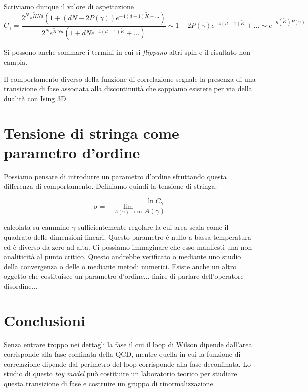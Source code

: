 \documentclass[12pt,a4paper]{article}
\begin{document}
Scriviamo dunque il valore di aspettazione
\begin{equation}
C_{\gamma} = \frac{2^{N} e^{\tilde{K} N d} \left( 1 + \left( dN - 2P(\gamma) \right) e^{-4 (d-1) \tilde{K} + ...} \right) }{2^{N} e^{\tilde{K} N d} \left( 1 + dN e^{-4 (d-1) \tilde{K}} + ... \right)} \sim 1 - 2P(\gamma) e^{-4 (d-1) \tilde{K}} + ... \sim e^{-g(\tilde{K}) P(\gamma)}
\end{equation}

Si possono anche sommare i termini in cui si \emph{flippano} altri spin e il risultato non cambia. 


Il comportamento diverso della funzione di correlazione segnale la presenza di una transizione di fase associata alla discontinuità che sappiamo esistere per via della dualità con Ising 3D

\section{Tensione di stringa come parametro d'ordine}

Possiamo pensare di introdurre un parametro d'ordine sfruttando questa differenza di comportamento. Definiamo quindi la tensione di stringa:

\begin{equation}
\sigma = - \lim_{A(\gamma) \rightarrow \infty} \frac{\ln C_{\gamma} }{ A(\gamma)}
\end{equation}

calcolata su cammino $\gamma$ sufficientemente regolare la cui area scala come il quadrato delle dimensioni lineari. Questo parametro è nullo a bassa temperatura ed è diverso da zero ad alta.  Ci possiamo immaginare che esso manifesti una non analiticità al punto critico. Questo andrebbe verificato o mediante uno studio della convergenza o delle o mediante metodi numerici. 
Esiste anche un altro oggetto che costituisce un parametro d'ordine... finire di parlare dell'operatore disordine...

\section{Conclusioni}
Senza entrare troppo nei dettagli la fase il cui il loop di Wilson dipende dall'area corrisponde alla fase confinata della QCD, mentre quella in cui la funzione di correlazione dipende dal perimetro del loop corrisponde alla fase deconfinata. Lo studio di questo \textit{toy model} può costituire un laboratorio teorico per studiare questa transizione di fase e costruire un gruppo di rinormalizzazione. 
\end{document}

